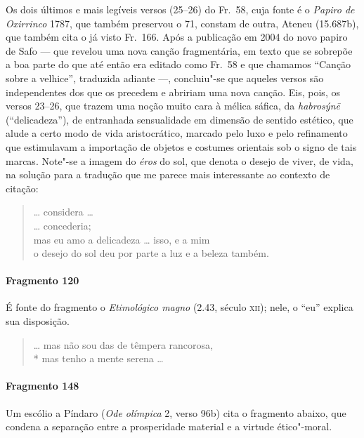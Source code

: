 {\small Os dois últimos e mais legíveis versos (25--26) do Fr.~58, cuja fonte é o
\textit{Papiro de Oxirrinco }1787, que também preservou o 71, constam de outra, Ateneu (15.687b), que também cita o já visto Fr.~166. Após a publicação em 2004 do
novo papiro de Safo --- que revelou uma nova canção fragmentária, em texto que se
sobrepõe a boa parte do que até então era editado como Fr.~58 e que chamamos ``Canção sobre a velhice'', traduzida adiante ---, concluiu"-se que aqueles
versos são independentes dos que os precedem e abririam uma nova canção. Eis, pois, os versos 23--26, que
trazem uma noção muito cara à mélica sáfica, da \textit{habrosýnē}
(``delicadeza”), de entranhada sensualidade em dimensão de sentido
estético, que alude a certo modo de vida aristocrático, marcado pelo luxo e pelo
refinamento que estimulavam a importação de objetos e costumes orientais
sob o signo de tais marcas. Note"-se a imagem do \textit{éros} do sol, que denota o desejo de viver, de vida, na solução para a tradução que me parece mais interessante ao contexto de citação:}

\begin{verse}
\ldots{} considera \ldots{}\\
\ldots{} concederia;\\
mas eu amo a delicadeza \ldots{} isso, e a mim\\
o desejo do sol deu por parte a luz e a beleza também.
\end{verse}

\paragraph{Fragmento 120}

{\small É fonte do fragmento o \textit{Etimológico magno} (2.43, século \textsc{xii}); nele, o “eu”
explica sua disposição.}

\begin{verse}
\ldots{} mas não sou das de têmpera rancorosa,\\*
mas tenho a mente serena \ldots{}
\end{verse}

\paragraph{Fragmento 148}

{\small Um escólio a Píndaro (\textit{Ode olímpica} 2, verso 96b) cita o fragmento abaixo,
que condena a separação entre a prosperidade material e a virtude ético"-moral.}

